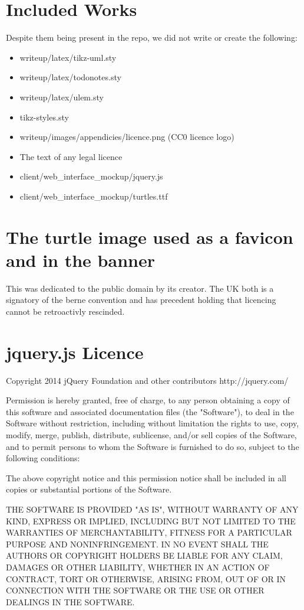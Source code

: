 \section{Included Works}
Despite them being present in the repo, we did not write or create the following:
\begin{itemize}
\item writeup/latex/tikz-uml.sty
\item writeup/latex/todonotes.sty
\item writeup/latex/ulem.sty
\item tikz-styles.sty
\item writeup/images/appendicies/licence.png (CC0 licence logo)
\item The text of any legal licence
\item client/web\_interface\_mockup/jquery.js
\item client/web\_interface\_mockup/turtles.ttf
\end{itemize}

\section{The turtle image used as a favicon and in the banner}
This was dedicated to the public domain by its creator. The UK both is a
signatory of the berne convention and has precedent holding that licencing
cannot be retroactivly rescinded.

\section{jquery.js Licence}
Copyright 2014 jQuery Foundation and other contributors
http://jquery.com/

Permission is hereby granted, free of charge, to any person obtaining
a copy of this software and associated documentation files (the
"Software"), to deal in the Software without restriction, including
without limitation the rights to use, copy, modify, merge, publish,
distribute, sublicense, and/or sell copies of the Software, and to
permit persons to whom the Software is furnished to do so, subject to
the following conditions:

The above copyright notice and this permission notice shall be
included in all copies or substantial portions of the Software.

THE SOFTWARE IS PROVIDED "AS IS", WITHOUT WARRANTY OF ANY KIND,
EXPRESS OR IMPLIED, INCLUDING BUT NOT LIMITED TO THE WARRANTIES OF
MERCHANTABILITY, FITNESS FOR A PARTICULAR PURPOSE AND
NONINFRINGEMENT. IN NO EVENT SHALL THE AUTHORS OR COPYRIGHT HOLDERS BE
LIABLE FOR ANY CLAIM, DAMAGES OR OTHER LIABILITY, WHETHER IN AN ACTION
OF CONTRACT, TORT OR OTHERWISE, ARISING FROM, OUT OF OR IN CONNECTION
WITH THE SOFTWARE OR THE USE OR OTHER DEALINGS IN THE SOFTWARE.

